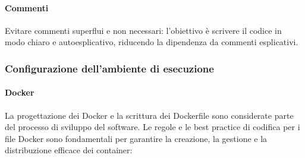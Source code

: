 \paragraph{Commenti}
Evitare commenti superflui e non necessari: l'obiettivo è scrivere il codice in modo chiaro e autoesplicativo, riducendo la dipendenza da commenti esplicativi. 
\subsubsection{Configurazione dell'ambiente di esecuzione}
\paragraph{Docker}

La progettazione dei Docker e la scrittura dei Dockerfile sono considerate parte del processo di sviluppo del software.
Le regole e le best practice di codifica per i file Docker sono fondamentali per garantire la creazione, la gestione e la distribuzione efficace dei container:
